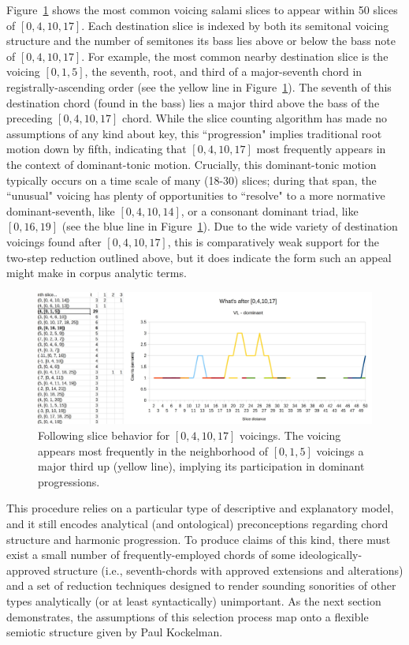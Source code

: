 Figure~\ref{[0,4,10,17]} shows the most common voicing salami slices to appear within 50 slices of $[0,4,10,17]$.  Each destination slice is indexed by both its semitonal voicing structure and the number of semitones its bass lies above or below the bass note of $[0,4,10,17]$.  For example, the most common nearby destination slice is the voicing $[0,1,5]$, the seventh, root, and third of a major-seventh chord in registrally-ascending order (see the yellow line in Figure~\ref{[0,4,10,17]}). The seventh of this destination chord (found in the bass) lies a major third above the bass of the preceding $[0,4,10,17]$ chord.  While the slice counting algorithm has made no assumptions of any kind about key, this ``progression" implies traditional root motion down by fifth, indicating that $[0,4,10,17]$ most frequently appears in the context of dominant-tonic motion.  Crucially, this dominant-tonic motion typically occurs on a time scale of many (18-30) slices; during that span, the ``unusual" voicing has plenty of opportunities to ``resolve" to a more normative dominant-seventh, like $[0,4,10,14]$, or a consonant dominant triad, like $[0,16,19]$ (see the blue line in Figure~\ref{[0,4,10,17]}).  Due to the wide variety of destination voicings found after $[0,4,10,17]$, this is comparatively weak support for the two-step reduction outlined above, but it does indicate the form such an appeal might make in corpus analytic terms.

\begin{figure}
	\centering
	\includegraphics[width=6.5in]{041017_behavior.jpg}
	\caption{Following slice behavior for $[0,4,10,17]$ voicings.  The voicing appears most frequently in the neighborhood of $[0,1,5]$ voicings a major third up (yellow line), implying its participation in dominant progressions.}
	\label{[0,4,10,17]}
\end{figure}


This procedure relies on a particular type of descriptive and explanatory model, and it still encodes analytical (and ontological) preconceptions regarding chord structure and harmonic progression.  To produce claims of this kind, there must exist a small number of frequently-employed chords of some ideologically-approved structure (i.e., seventh-chords with approved extensions and alterations) and a set of reduction techniques designed to render sounding sonorities of other types analytically (or at least syntactically) unimportant.  As the next section demonstrates, the assumptions of this selection process map onto a flexible semiotic structure given by Paul Kockelman. 

